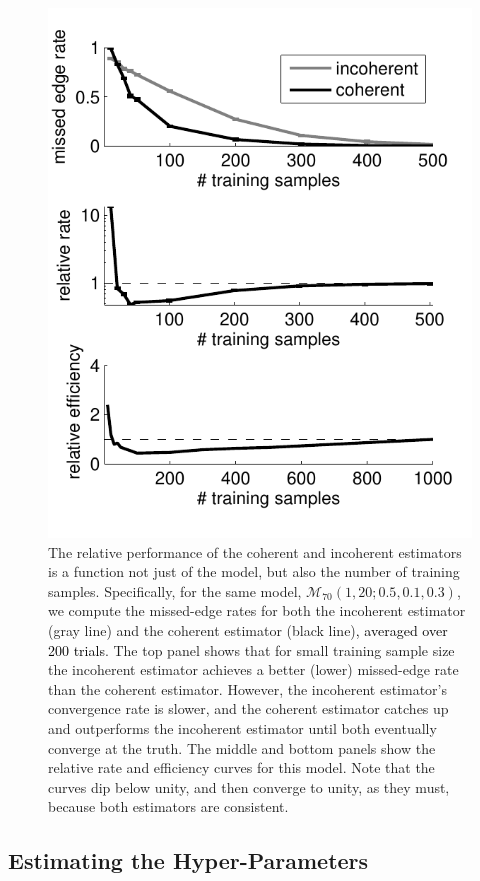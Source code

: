 \documentclass[10pt,journal,cspaper,compsoc]{IEEEtran}
\providecommand{\tk}[1]{\textcolor{black}{#1}}
\providecommand{\mc}[1]{\mathcal{#1}}
\begin{document}
\begin{figure}[htbp]
	\centering
		\includegraphics[width=0.8\linewidth]{RE_V70_s20_p10_q30.pdf}
	\caption{The relative performance of the coherent and incoherent estimators is a function not just of the model, but also the number of training samples.  Specifically, for the same model, $\mc{M}_{70}(1,20;0.5,0.1,0.3)$, we compute the missed-edge rates for both the incoherent estimator (gray line) and the coherent estimator (black line)\tk{, averaged over 200 trials}.  The top panel shows that for small training sample size the incoherent estimator achieves a better (lower) missed-edge rate than the coherent estimator. However, the incoherent estimator's convergence rate is slower, and the coherent estimator catches up and outperforms the incoherent estimator until both eventually converge at the truth.  The middle and bottom panels show the relative rate and efficiency curves for this model. Note that the curves dip below unity, and then converge to unity, as they must, because both estimators are consistent. }
	\label{fig:RE}
\end{figure}


\subsection{Estimating the Hyper-Parameters} %
\label{sub:estimating_the_hyper_parameters}
\end{document}
